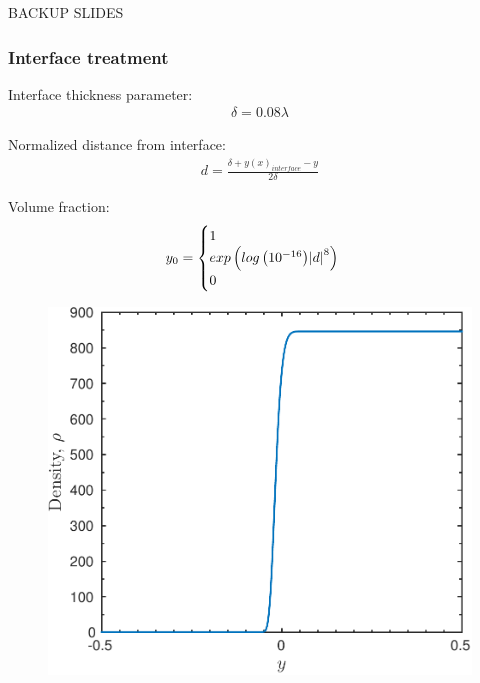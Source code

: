\begin{frame}
  \vfill
  {\LARGE
    \begin{center}
      BACKUP SLIDES
    \end{center}
  }
  \vfill
\end{frame}




\begin{frame}\frametitle{\vspace*{0.5cm}Interface treatment}
  {\small
    \begin{minipage}{0.55\textwidth}
      Interface thickness parameter:
      \begin{align*}
        \delta = 0.08\lambda%
      \end{align*}
      
      Normalized distance from interface:
      \begin{align*}
        d = \frac{\delta +y(x)_{interface} -y}{2\delta}
      \end{align*}


      Volume fraction:%
      \begin{align*}
        y_0 = %
        \begin{cases}
          1\\%
          exp\left(log\left(10^{-16}\right)\abs{d}^8\right)\\%
          0%
        \end{cases}%
      \end{align*}
    \end{minipage}
    \begin{minipage}{0.4\textwidth}
      \begin{figure}
        \centering
        \includegraphics[width=\textwidth]{./figs/interface_density}
      \end{figure}
    \end{minipage}
  }
\end{frame}

